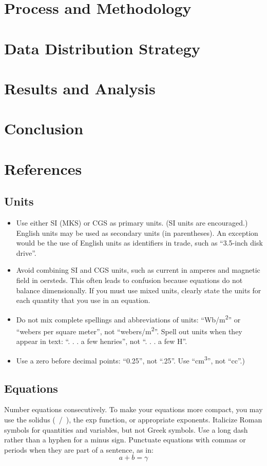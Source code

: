 \documentclass[conference]{IEEEtran}
\begin{document}
\section{Process and Methodology}
\section{Data Distribution Strategy}
\section{Results and Analysis}
\section{Conclusion}
\section{References}
\subsection{Units}
\begin{itemize}
\item Use either SI (MKS) or CGS as primary units. (SI units are encouraged.) English units may be used as secondary units (in parentheses). An exception would be the use of English units as identifiers in trade, such as ``3.5-inch disk drive''.
\item Avoid combining SI and CGS units, such as current in amperes and magnetic field in oersteds. This often leads to confusion because equations do not balance dimensionally. If you must use mixed units, clearly state the units for each quantity that you use in an equation.
\item Do not mix complete spellings and abbreviations of units: ``Wb/m\textsuperscript{2}'' or ``webers per square meter'', not ``webers/m\textsuperscript{2}''. Spell out units when they appear in text: ``. . . a few henries'', not ``. . . a few H''.
\item Use a zero before decimal points: ``0.25'', not ``.25''. Use ``cm\textsuperscript{3}'', not ``cc''.)
\end{itemize}

\subsection{Equations}
Number equations consecutively. To make your 
equations more compact, you may use the solidus (~/~), the exp function, or 
appropriate exponents. Italicize Roman symbols for quantities and variables, 
but not Greek symbols. Use a long dash rather than a hyphen for a minus 
sign. Punctuate equations with commas or periods when they are part of a 
sentence, as in:
\begin{equation}
a+b=\gamma\label{eq}
\end{equation}
\end{document}
